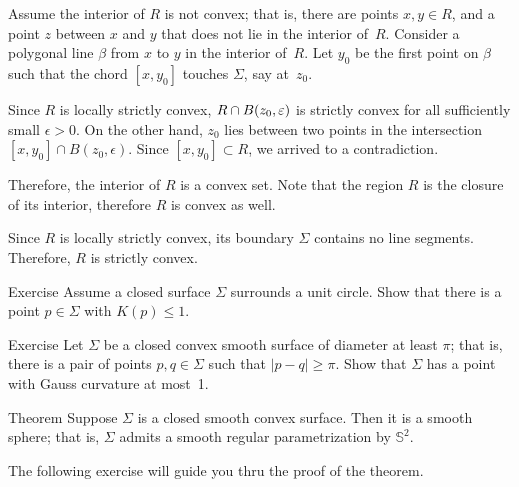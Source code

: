 Assume the interior of $R$ is not convex;
that is, there are points $x,y\in R$, and a point $z$ between $x$ and $y$ that does not lie in the interior of~$R$.
Consider a polygonal  line $\beta$ from $x$ to $y$ in the interior of~$R$.
Let $y_0$ be the first point on $\beta$ such that the chord $[x,y_0]$ touches $\Sigma$, say at~$z_0$.

Since $R$ is locally strictly convex, $R\z\cap B(z_0,\epsilon)$ is strictly convex for all sufficiently small $\epsilon>0$.
On the other hand, $z_0$ lies between two points in the intersection $[x,y_0]\cap B(z_0,\epsilon)$.
Since $[x,y_0]\subset R$, we arrived to a contradiction.

Therefore, the interior of $R$ is a convex set.
Note that the region $R$ is the closure of its interior, therefore $R$ is convex as well.

Since $R$ is locally strictly convex, its boundary $\Sigma$ contains no line segments.
Therefore, $R$ is strictly convex.
\qeds

\begin{thm}{Exercise}\label{ex:surrounds-disc}
Assume a closed surface $\Sigma$ surrounds a unit circle.
Show that there is a point  $p \in \Sigma$ with $K(p)\le 1$. 
\end{thm} 

\begin{thm}{Exercise}\label{ex:small-gauss}
Let $\Sigma$ be a closed convex smooth surface of diameter at least $\pi$;
that is, there is a pair of points $p,q\in\Sigma$ such that $|p-q|\ge \pi$.
Show that $\Sigma$ has a point with Gauss curvature at most~1.
\end{thm}

\begin{thm}{Theorem}\label{thm:convex-closed}
Suppose $\Sigma$ is a closed smooth convex surface.
Then it is a smooth sphere; that is, $\Sigma$ admits a smooth regular parametrization by $\mathbb{S}^2$.\end{thm}

The following exercise will guide you thru the proof of the theorem.

